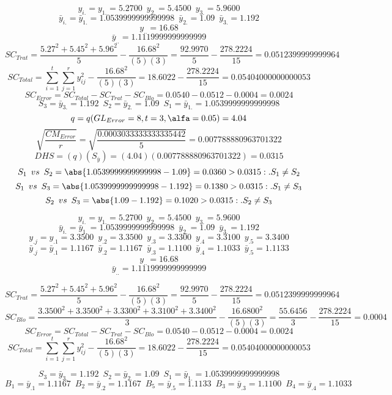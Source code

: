 $$y_{i.}=y_{1.}=5.2700 \enspace y_{2.}=5.4500 \enspace y_{3.}=5.9600$$
$$\bar{y}_{i.}=\bar{y}_{1.}=1.0539999999999998 \enspace \bar{y}_{2.}=1.09 \enspace \bar{y}_{3.}=1.192$$
$$y_{..}=16.68$$
$$\bar{y}_{..}=1.1119999999999999$$
$$SC_{Trat}=\frac{5.27^{2}+5.45^{2}+5.96^{2}}{5}-\frac{16.68^{2}}{(5)(3)}=\frac{92.9970}{5}-\frac{278.2224}{15}=0.0512399999999964$$
$$SC_{Total}=\sum_{i=1}^{\mathit{t}}\sum_{j=1}^{\mathit{r}}y_{ij}^{2}-\frac{16.68^{2}}{(5)(3)}=18.6022-\frac{278.2224}{15}=0.05404000000000053$$
$$SC_{Error}=SC_{Total}-SC_{Trat}-SC_{Blo}=0.0540-0.0512-0.0004=0.0024$$
$$S_{3}=\bar{y}_{3.}=1.192 \enspace S_{2}=\bar{y}_{2.}=1.09 \enspace S_{1}=\bar{y}_{1.}=1.0539999999999998$$
$$q=q(GL_{Error}=8, t=3, \alfa=0.05)=4.04$$
$$\sqrt{\frac{CM_{Error}}{r}}=\sqrt{\frac{0.0003033333333335442}{5}}=0.007788880963701322$$
$$DHS=(q)(S_{\bar{y}})=(4.04)(0.007788880963701322)=0.0315$$
$$S_{1} \enspace vs \enspace S_{2} = \abs{1.0539999999999998-1.09}=0.0360>0.0315:.S_{1}\not=S_{2}$$
$$S_{1} \enspace vs \enspace S_{3} = \abs{1.0539999999999998-1.192}=0.1380>0.0315:.S_{1}\not=S_{3}$$
$$S_{2} \enspace vs \enspace S_{3} = \abs{1.09-1.192}=0.1020>0.0315:.S_{2}\not=S_{3}$$


$$y_{i.}=y_{1.}=5.2700 \enspace y_{2.}=5.4500 \enspace y_{3.}=5.9600$$
$$\bar{y}_{i.}=\bar{y}_{1.}=1.0539999999999998 \enspace \bar{y}_{2.}=1.09 \enspace \bar{y}_{3.}=1.192$$
$$y_{.j}=y_{.1}=3.3500 \enspace y_{.2}=3.3500 \enspace y_{.3}=3.3300 \enspace y_{.4}=3.3100 \enspace y_{.5}=3.3400$$
$$\bar{y}_{.j}=\bar{y}_{.1}=1.1167 \enspace \bar{y}_{.2}=1.1167 \enspace \bar{y}_{.3}=1.1100 \enspace \bar{y}_{.4}=1.1033 \enspace \bar{y}_{.5}=1.1133$$
$$y_{..}=16.68$$
$$\bar{y}_{..}=1.1119999999999999$$

$$SC_{Trat}=\frac{5.27^{2}+5.45^{2}+5.96^{2}}{5}-\frac{16.68^{2}}{(5)(3)}=\frac{92.9970}{5}-\frac{278.2224}{15}=0.0512399999999964$$
$$SC_{Blo}=\frac{3.3500^{2}+3.3500^{2}+3.3300^{2}+3.3100^{2}+3.3400^{2}}{3}-\frac{16.6800^{2}}{(5)(3)}=\frac{55.6456}{3}-\frac{278.2224}{15}=0.0004$$
$$SC_{Error}=SC_{Total}-SC_{Trat}-SC_{Blo}=0.0540-0.0512-0.0004=0.0024$$
$$SC_{Total}=\sum_{i=1}^{\mathit{t}}\sum_{j=1}^{\mathit{r}}y_{ij}^{2}-\frac{16.68^{2}}{(5)(3)}=18.6022-\frac{278.2224}{15}=0.05404000000000053$$

$$S_{3}=\bar{y}_{3.}=1.192 \enspace S_{2}=\bar{y}_{2.}=1.09 \enspace S_{1}=\bar{y}_{1.}=1.0539999999999998$$
$$B_{1}=\bar{y}_{.1}=1.1167 \enspace B_{2}=\bar{y}_{.2}=1.1167 \enspace B_{5}=\bar{y}_{.5}=1.1133 \enspace B_{3}=\bar{y}_{.3}=1.1100 \enspace B_{4}=\bar{y}_{.4}=1.1033$$


